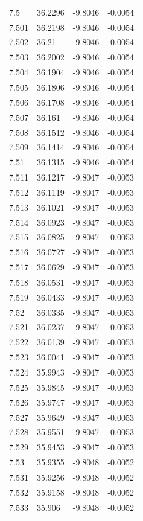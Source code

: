 \begin{tabular}{llll}
7.5 & 36.2296 & -9.8046 & -0.0054 \\
7.501 & 36.2198 & -9.8046 & -0.0054 \\
7.502 & 36.21 & -9.8046 & -0.0054 \\
7.503 & 36.2002 & -9.8046 & -0.0054 \\
7.504 & 36.1904 & -9.8046 & -0.0054 \\
7.505 & 36.1806 & -9.8046 & -0.0054 \\
7.506 & 36.1708 & -9.8046 & -0.0054 \\
7.507 & 36.161 & -9.8046 & -0.0054 \\
7.508 & 36.1512 & -9.8046 & -0.0054 \\
7.509 & 36.1414 & -9.8046 & -0.0054 \\
7.51 & 36.1315 & -9.8046 & -0.0054 \\
7.511 & 36.1217 & -9.8047 & -0.0053 \\
7.512 & 36.1119 & -9.8047 & -0.0053 \\
7.513 & 36.1021 & -9.8047 & -0.0053 \\
7.514 & 36.0923 & -9.8047 & -0.0053 \\
7.515 & 36.0825 & -9.8047 & -0.0053 \\
7.516 & 36.0727 & -9.8047 & -0.0053 \\
7.517 & 36.0629 & -9.8047 & -0.0053 \\
7.518 & 36.0531 & -9.8047 & -0.0053 \\
7.519 & 36.0433 & -9.8047 & -0.0053 \\
7.52 & 36.0335 & -9.8047 & -0.0053 \\
7.521 & 36.0237 & -9.8047 & -0.0053 \\
7.522 & 36.0139 & -9.8047 & -0.0053 \\
7.523 & 36.0041 & -9.8047 & -0.0053 \\
7.524 & 35.9943 & -9.8047 & -0.0053 \\
7.525 & 35.9845 & -9.8047 & -0.0053 \\
7.526 & 35.9747 & -9.8047 & -0.0053 \\
7.527 & 35.9649 & -9.8047 & -0.0053 \\
7.528 & 35.9551 & -9.8047 & -0.0053 \\
7.529 & 35.9453 & -9.8047 & -0.0053 \\
7.53 & 35.9355 & -9.8048 & -0.0052 \\
7.531 & 35.9256 & -9.8048 & -0.0052 \\
7.532 & 35.9158 & -9.8048 & -0.0052 \\
7.533 & 35.906 & -9.8048 & -0.0052 \\

\end{tabular}
